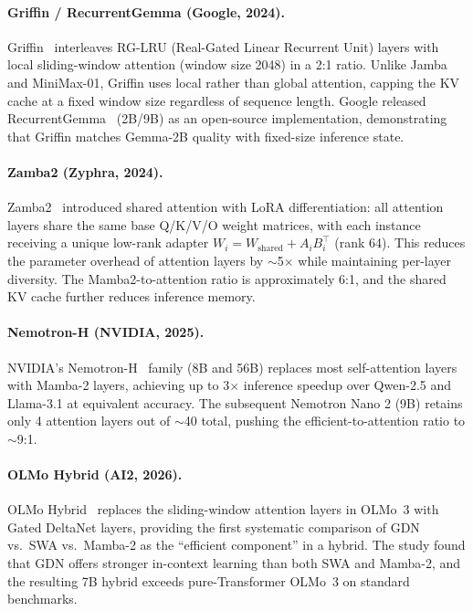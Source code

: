 \paragraph{Griffin / RecurrentGemma (Google, 2024).}
Griffin~\cite{de2024griffin} interleaves RG-LRU (Real-Gated Linear Recurrent Unit) layers with local sliding-window attention (window size 2048) in a 2:1 ratio. Unlike Jamba and MiniMax-01, Griffin uses local rather than global attention, capping the KV cache at a fixed window size regardless of sequence length. Google released RecurrentGemma~\cite{botev2024recurrentgemma} (2B/9B) as an open-source implementation, demonstrating that Griffin matches Gemma-2B quality with fixed-size inference state.

\paragraph{Zamba2 (Zyphra, 2024).}
Zamba2~\cite{zyphra2024zamba2} introduced shared attention with LoRA differentiation: all attention layers share the same base Q/K/V/O weight matrices, with each instance receiving a unique low-rank adapter $W_i = W_{\text{shared}} + A_i B_i^\top$ (rank 64). This reduces the parameter overhead of attention layers by $\sim$5$\times$ while maintaining per-layer diversity. The Mamba2-to-attention ratio is approximately 6:1, and the shared KV cache further reduces inference memory.

\paragraph{Nemotron-H (NVIDIA, 2025).}
NVIDIA's Nemotron-H~\cite{nvidia2025nemotronh} family (8B and 56B) replaces most self-attention layers with Mamba-2 layers, achieving up to 3$\times$ inference speedup over Qwen-2.5 and Llama-3.1 at equivalent accuracy. The subsequent Nemotron Nano 2 (9B) retains only 4 attention layers out of $\sim$40 total, pushing the efficient-to-attention ratio to $\sim$9:1.

\paragraph{OLMo Hybrid (AI2, 2026).}
OLMo Hybrid~\cite{ai2_2026_olmo_hybrid} replaces the sliding-window attention layers in OLMo~3 with Gated DeltaNet layers, providing the first systematic comparison of GDN vs.\ SWA vs.\ Mamba-2 as the ``efficient component'' in a hybrid. The study found that GDN offers stronger in-context learning than both SWA and Mamba-2, and the resulting 7B hybrid exceeds pure-Transformer OLMo~3 on standard benchmarks.

